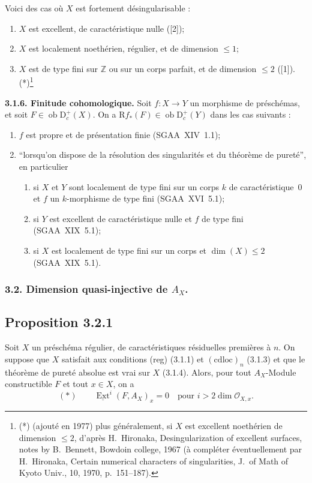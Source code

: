 \documentclass[11pt]{article}
\providecommand{\cO}{\mathcal{O}}
\DeclareMathOperator{\Ext}{Ext}
\newcommand{\R}{\mathrm{R}}
\newcommand{\D}{\mathrm{D}}
\newcommand{\Z}{\mathbb{Z}}
\newcommand{\ob}{\operatorname{ob}}
\providecommand{\ob}{\operatorname{ob}}
\providecommand{\R}{\mathrm R}
\providecommand{\Z}{\mathbb Z}
\begin{document}
Voici des cas où $X$ est fortement désingularisable :
\begin{enumerate}
\item[a)] $X$ est excellent, de caractéristique nulle ([2]);
\item[b)] $X$ est localement noethérien, régulier, et de dimension $\leqslant 1$;
\item[c)] $X$ est de type fini sur $\Z$ ou sur un corps parfait, et de dimension $\leqslant 2$ ([1]).(*)\footnote{(*) (ajouté en 1977) plus généralement, si $X$ est excellent noethérien de dimension $\leqslant 2$, d'après H.~Hironaka, Desingularization of excellent surfaces, notes by B.~Bennett, Bowdoin college, 1967 (à compléter éventuellement par H.~Hironaka, Certain numerical characters of singularities, J.~of Math of Kyoto Univ., 10, 1970, p.~151--187).}
\end{enumerate}

\textbf{3.1.6. Finitude cohomologique.} Soit $f : X \to Y$ un morphisme de préschémas, et soit $F \in \ob \D_c^{+}(X)$. On a $\R f_{*}(F) \in \ob \D_c^{+}(Y)$ dans les cas suivants :
\begin{enumerate}
\item[a)] $f$ est propre et de présentation finie (SGAA~XIV~1.1);
\item[b)] ``lorsqu'on dispose de la résolution des singularités et du théorème de pureté'', en particulier
\begin{enumerate}
\item[(i)] si $X$ et $Y$ sont localement de type fini sur un corps $k$ de caractéristique~0 et $f$ un $k$-morphisme de type fini (SGAA~XVI~5.1);
\item[(ii)] si $Y$ est excellent de caractéristique nulle et $f$ de type fini (SGAA~XIX~5.1);
\item[(iii)] si $X$ est localement de type fini sur un corps et $\dim(X) \leqslant 2$ (SGAA~XIX~5.1).
\end{enumerate}
\end{enumerate}

\subsubsection{3.2. Dimension quasi-injective de $A_X$.}

\subsection*{Proposition 3.2.1}
Soit $X$ un préschéma régulier, de caractéristiques résiduelles premières à $n$. On suppose que $X$ satisfait aux conditions (reg) (3.1.1) et $(\mathrm{cdloc})_n$ (3.1.3) et que le théorème de pureté absolue est vrai sur $X$ (3.1.4). Alors, pour tout $A_X$-Module constructible $F$ et tout $x \in X$, on a
\[
(*) \qquad \underline{\Ext}^i(F, A_X)_x = 0 \quad \text{pour } i > 2\dim \cO_{X,x}.
\]
\end{document}
